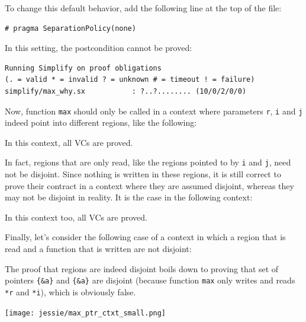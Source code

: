 \documentclass[a4paper,11pt,twoside,openright]{report}
\begin{document}


To change this default behavior, add the following line at the top of the file:
\begin{verbatim}
# pragma SeparationPolicy(none)
\end{verbatim}

In this setting, the postcondition cannot be proved:

\begin{verbatim}
Running Simplify on proof obligations
(. = valid * = invalid ? = unknown # = timeout ! = failure)
simplify/max_why.sx           : ?..?........ (10/0/2/0/0)
\end{verbatim}

Now, function \verb|max| should only be called in a context where
parameters \verb|r|, \verb|i| and \verb|j| indeed point into
different regions, like the following:



In this context, all VCs are proved.

In fact, regions that are only read, like the regions pointed to by
\verb|i| and \verb|j|, need not be disjoint. Since nothing is written
in these regions, it is still correct to prove their contract in a
context where they are assumed disjoint, whereas they may not be
disjoint in reality. It is the case in the following context:



In this context too, all VCs are proved.

Finally, let's consider the following case of a context in which a
region that is read and a function that is written are not disjoint:



The proof that regions are indeed disjoint boils down to proving that
set of pointers \verb|{&a}| and \verb|{&a}| are disjoint (because
function \verb|max| only writes and reads \verb|*r| and \verb|*i|),
which is obviously false.

\begin{center}
  \texttt{[image: jessie/max\_ptr\_ctxt\_small.png]}
\end{center}


\end{document}
